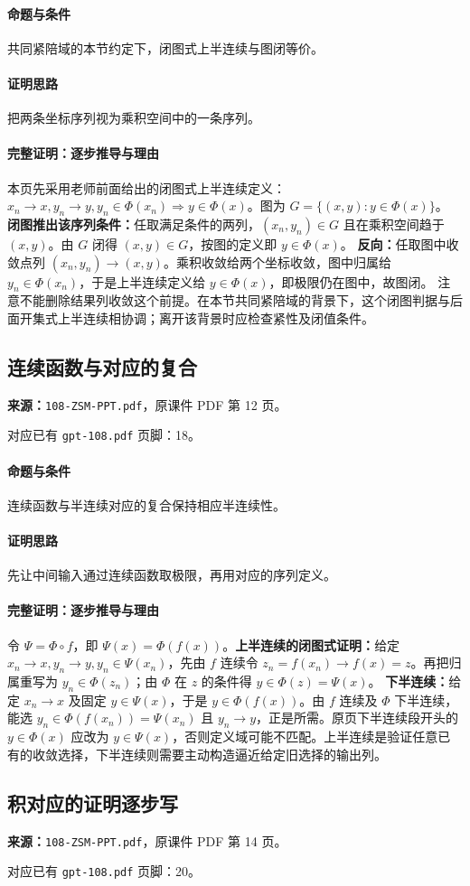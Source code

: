 \paragraph{命题与条件}共同紧陪域的本节约定下，闭图式上半连续与图闭等价。
\paragraph{证明思路}把两条坐标序列视为乘积空间中的一条序列。
\paragraph{完整证明：逐步推导与理由}
本页先采用老师前面给出的闭图式上半连续定义：$x_n\to x,y_n\to y,y_n\in\Phi(x_n)\Rightarrow y\in\Phi(x)$。图为 $G=\{(x,y):y\in\Phi(x)\}$。
\textbf{闭图推出该序列条件：}任取满足条件的两列，$(x_n,y_n)\in G$ 且在乘积空间趋于 $(x,y)$。由 $G$ 闭得 $(x,y)\in G$，按图的定义即 $y\in\Phi(x)$。
\textbf{反向：}任取图中收敛点列 $(x_n,y_n)\to(x,y)$。乘积收敛给两个坐标收敛，图中归属给 $y_n\in\Phi(x_n)$，于是上半连续定义给 $y\in\Phi(x)$，即极限仍在图中，故图闭。
注意不能删除结果列收敛这个前提。在本节共同紧陪域的背景下，这个闭图判据与后面开集式上半连续相协调；离开该背景时应检查紧性及闭值条件。
\clearpage\subsection{连续函数与对应的复合}
\textbf{来源：}\texttt{108-ZSM-PPT.pdf}，原课件 PDF 第 12 页。\par
对应已有 \texttt{gpt-108.pdf} 页脚：18。\par
\paragraph{命题与条件}连续函数与半连续对应的复合保持相应半连续性。
\paragraph{证明思路}先让中间输入通过连续函数取极限，再用对应的序列定义。
\paragraph{完整证明：逐步推导与理由}
令 $\Psi=\Phi\circ f$，即 $\Psi(x)=\Phi(f(x))$。\textbf{上半连续的闭图式证明：}给定 $x_n\to x,y_n\to y,y_n\in\Psi(x_n)$，先由 $f$ 连续令 $z_n=f(x_n)\to f(x)=z$。再把归属重写为 $y_n\in\Phi(z_n)$；由 $\Phi$ 在 $z$ 的条件得 $y\in\Phi(z)=\Psi(x)$。
\textbf{下半连续：}给定 $x_n\to x$ 及固定 $y\in\Psi(x)$，于是 $y\in\Phi(f(x))$。由 $f$ 连续及 $\Phi$ 下半连续，能选 $y_n\in\Phi(f(x_n))=\Psi(x_n)$ 且 $y_n\to y$，正是所需。原页下半连续段开头的 $y\in\Phi(x)$ 应改为 $y\in\Psi(x)$，否则定义域可能不匹配。上半连续是验证任意已有的收敛选择，下半连续则需要主动构造逼近给定旧选择的输出列。
\clearpage\subsection{积对应的证明逐步写}
\textbf{来源：}\texttt{108-ZSM-PPT.pdf}，原课件 PDF 第 14 页。\par
对应已有 \texttt{gpt-108.pdf} 页脚：20。\par
